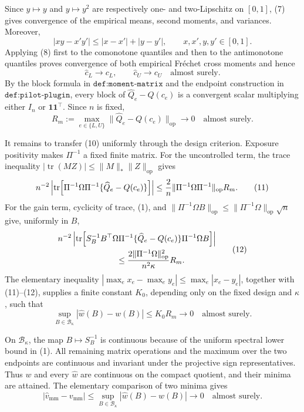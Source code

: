 Since \(y\mapsto y\) and \(y\mapsto y^2\) are respectively one- and two-Lipschitz on \([0,1]\), (7) gives convergence of the empirical means, second moments, and variances.  Moreover,
\[
|xy-x'y'|\le |x-x'|+|y-y'|,
\qquad x,x',y,y'\in[0,1].
\tag{8}
\]
Applying (8) first to the comonotone quantiles and then to the antimonotone quantiles proves convergence of both empirical Fr\'echet cross moments and hence
\[
\widehat c_L\to c_L,
\qquad
\widehat c_U\to c_U
\quad\text{almost surely}.
\tag{9}
\]
By the block formula in \(\texttt{def:moment-matrix}\) and the endpoint construction in \(\texttt{def:pilot-plugin}\), every block of \(\widehat Q_e-Q(c_e)\) is a convergent scalar multiplying either \(I_n\) or \(\mathbf 1\mathbf 1^{\top}\).  Since \(n\) is fixed,
\[
R_m:=\max_{e\in\{L,U\}}
\lVert\widehat Q_e-Q(c_e)\rVert_{\mathrm{op}}\longrightarrow0
\quad\text{almost surely}.
\tag{10}
\]

It remains to transfer (10) uniformly through the design criterion.  Exposure positivity makes \(\Pi^{-1}\) a fixed finite matrix.  For the uncontrolled term, the trace inequality \(|\operatorname{tr}(MZ)|\le\lVert M\rVert_*\lVert Z\rVert_{\mathrm{op}}\) gives
\[
n^{-2}\left|
\operatorname{tr}\!\left[\Pi^{-1}\Omega\Pi^{-1}
\{\widehat Q_e-Q(c_e)\}\right]\right|
\le {2\over n}\lVert\Pi^{-1}\Omega\Pi^{-1}\rVert_{\mathrm{op}}R_m.
\tag{11}
\]
For the gain term, cyclicity of trace, (1), and
\(\lVert\Pi^{-1}\Omega B\rVert_{\mathrm{op}}
\le\lVert\Pi^{-1}\Omega\rVert_{\mathrm{op}}\sqrt n\) give, uniformly in \(B\),
\[
\begin{split}
&n^{-2}\left|\operatorname{tr}\!\left[
S_B^{-1}B^{\top}\Omega\Pi^{-1}
\{\widehat Q_e-Q(c_e)\}
\Pi^{-1}\Omega B\right]\right|\\
&\hspace{25mm}\le
{2\lVert\Pi^{-1}\Omega\rVert_{\mathrm{op}}^2
\over n^2\kappa}R_m.
\end{split}
\tag{12}
\]
The elementary inequality
\(\left|\max_e x_e-\max_e y_e\right|\le\max_e|x_e-y_e|\), together with (11)--(12), supplies a finite constant \(K_0\), depending only on the fixed design and \(\kappa\), such that
\[
\sup_{B\in\mathcal B_\kappa}|\widehat w(B)-w(B)|
\le K_0R_m\longrightarrow0
\quad\text{almost surely}.
\tag{13}
\]

On \(\mathcal B_\kappa\), the map \(B\mapsto S_B^{-1}\) is continuous because of the uniform spectral lower bound in (1).  All remaining matrix operations and the maximum over the two endpoints are continuous and invariant under the projective sign representatives.  Thus \(w\) and every \(\widehat w\) are continuous on the compact quotient, and their minima are attained.  The elementary comparison of two minima gives
\[
|\widehat v_{\mathrm{mm}}-v_{\mathrm{mm}}|
\le\sup_{B\in\mathcal B_\kappa}|\widehat w(B)-w(B)|
\longrightarrow0
\quad\text{almost surely}.
\tag{14}
\]

